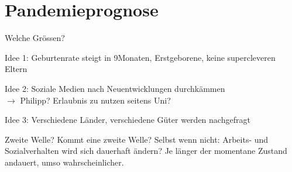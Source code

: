 \documentclass{beamer}
\begin{document}
\section{Pandemieprognose}

\begin{frame}{Welche Gr\"ossen?}

\begin{exampleblock}{Idee 1:}
Geburtenrate steigt in 9Monaten, Erstgeborene, keine supercleveren Eltern
\end{exampleblock}

\begin{exampleblock}{Idee 2:}
Soziale Medien nach Neuentwicklungen durchk\"ammen\\
$\rightarrow$ Philipp? Erlaubnis zu nutzen seitens Uni?
\end{exampleblock}

\begin{exampleblock}{Idee 3:}
Verschiedene L\"ander, verschiedene G\"uter werden nachgefragt
\end{exampleblock}

\begin{alertblock}{Zweite Welle?}
Kommt eine zweite Welle? Selbst wenn nicht: Arbeits- und Sozialverhalten wird sich dauerhaft \"andern? Je l\"anger der momentane Zustand andauert, umso wahrscheinlicher.
\end{alertblock}

\end{frame}
\end{document}
